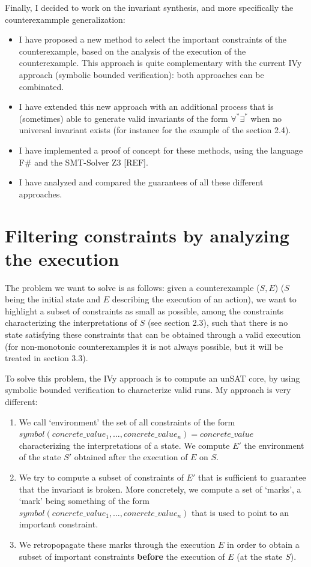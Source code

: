 \documentclass[11pt,a4paper,oldfontcommands,openany]{memoir}
\begin{document}
    Finally, I decided to work on the invariant synthesis, and more specifically the counterexammple generalization:
    \begin{itemize}
        \item I have proposed a new method to select the important constraints of the counterexample, based on the analysis of the execution of the counterexample.
        This approach is quite complementary with the current IVy approach (symbolic bounded verification): both approaches can be combinated. 
        \item I have extended this new approach with an additional process that is (sometimes) able to generate valid invariants of the form \(\forall^*\exists^*\)
        when no universal invariant exists (for instance for the example of the section 2.4).
        \item I have implemented a proof of concept for these methods, using the language F\# and the SMT-Solver Z3 [REF].        
        \item I have analyzed and compared the guarantees of all these different approaches.
    \end{itemize}

    \section{Filtering constraints by analyzing the execution}

    The problem we want to solve is as follows: given a counterexample (\(S,E\)) (\(S\) being the initial state and \(E\) describing the execution of an action),
    we want to highlight a subset of constraints as small as possible, among the constraints characterizing the interpretations of \(S\) (see section 2.3), such that there is no state satisfying these constraints
    that can be obtained through a valid execution (for non-monotonic counterexamples it is not always possible, but it will be treated in section 3.3).

    To solve this problem, the IVy approach is to compute an unSAT core, by using symbolic bounded verification to characterize valid runs.
    My approach is very different:
    \begin{enumerate}
        \item We call `environment' the set of all constraints
        of the form \(symbol(concrete\_value_1,\ldots,concrete\_value_n) = concrete\_value\) characterizing the interpretations of a state.
        We compute \(E'\) the environment of the state \(S'\) obtained after the execution of \(E\) on \(S\).
        \item We try to compute a subset of constraints of \(E'\) that is sufficient to guarantee that the invariant is broken.
        More concretely, we compute a set of `marks', a `mark' being something of the form \(symbol(concrete\_value_1,\ldots,concrete\_value_n)\)
        that is used to point to an important constraint.
        \item We retropopagate these marks through the execution \(E\) in order to obtain a subset of important constraints \textbf{before} the execution
        of \(E\) (at the state \(S\)).
    \end{enumerate}
\end{document}
